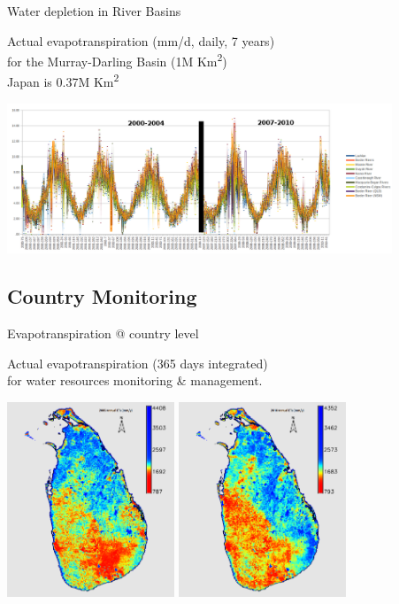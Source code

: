 \documentclass[xcolor=dvipsnames,beamer]{beamer} %
\begin{document}
\begin{frame}[fragile]{Water depletion in River Basins}

Actual evapotranspiration (mm/d, daily, 7 years)\\ 
for the Murray-Darling Basin (1M Km\textsuperscript{2})\\
Japan is 0.37M Km\textsuperscript{2}\\

\begin{center}
 \includegraphics[width=11.5cm]{mdbmeanet}
\end{center}
\end{frame}

\subsection{Country Monitoring}
\begin{frame}[fragile]{Evapotranspiration @ country level}

Actual evapotranspiration (365 days integrated)\\ 
for water resources monitoring \& management.\\

\begin{center}
 \includegraphics[width=5cm]{slet2005}
 \hspace{10mm}
 \includegraphics[width=5cm]{slet2010}
\end{center}
\end{frame}
\end{document}
